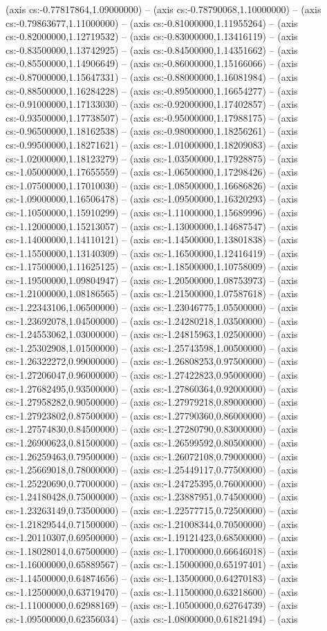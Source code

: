 (axis cs:-0.77817864,1.09000000) -- (axis cs:-0.78790068,1.10000000) -- (axis cs:-0.79863677,1.11000000) -- (axis cs:-0.81000000,1.11955264) -- (axis cs:-0.82000000,1.12719532) -- (axis cs:-0.83000000,1.13416119) -- (axis cs:-0.83500000,1.13742925) -- (axis cs:-0.84500000,1.14351662) -- (axis cs:-0.85500000,1.14906649) -- (axis cs:-0.86000000,1.15166066) -- (axis cs:-0.87000000,1.15647331) -- (axis cs:-0.88000000,1.16081984) -- (axis cs:-0.88500000,1.16284228) -- (axis cs:-0.89500000,1.16654277) -- (axis cs:-0.91000000,1.17133030) -- (axis cs:-0.92000000,1.17402857) -- (axis cs:-0.93500000,1.17738507) -- (axis cs:-0.95000000,1.17988175) -- (axis cs:-0.96500000,1.18162538) -- (axis cs:-0.98000000,1.18256261) -- (axis cs:-0.99500000,1.18271621) -- (axis cs:-1.01000000,1.18209083) -- (axis cs:-1.02000000,1.18123279) -- (axis cs:-1.03500000,1.17928875) -- (axis cs:-1.05000000,1.17655559) -- (axis cs:-1.06500000,1.17298426) -- (axis cs:-1.07500000,1.17010030) -- (axis cs:-1.08500000,1.16686826) -- (axis cs:-1.09000000,1.16506478) -- (axis cs:-1.09500000,1.16320293) -- (axis cs:-1.10500000,1.15910299) -- (axis cs:-1.11000000,1.15689996) -- (axis cs:-1.12000000,1.15213057) -- (axis cs:-1.13000000,1.14687547) -- (axis cs:-1.14000000,1.14110121) -- (axis cs:-1.14500000,1.13801838) -- (axis cs:-1.15500000,1.13140309) -- (axis cs:-1.16500000,1.12416419) -- (axis cs:-1.17500000,1.11625125) -- (axis cs:-1.18500000,1.10758009) -- (axis cs:-1.19500000,1.09804947) -- (axis cs:-1.20500000,1.08753973) -- (axis cs:-1.21000000,1.08186565) -- (axis cs:-1.21500000,1.07587618) -- (axis cs:-1.22343106,1.06500000) -- (axis cs:-1.23046775,1.05500000) -- (axis cs:-1.23692078,1.04500000) -- (axis cs:-1.24280218,1.03500000) -- (axis cs:-1.24553062,1.03000000) -- (axis cs:-1.24815963,1.02500000) -- (axis cs:-1.25302908,1.01500000) -- (axis cs:-1.25743598,1.00500000) -- (axis cs:-1.26322272,0.99000000) -- (axis cs:-1.26808253,0.97500000) -- (axis cs:-1.27206047,0.96000000) -- (axis cs:-1.27422823,0.95000000) -- (axis cs:-1.27682495,0.93500000) -- (axis cs:-1.27860364,0.92000000) -- (axis cs:-1.27958282,0.90500000) -- (axis cs:-1.27979218,0.89000000) -- (axis cs:-1.27923802,0.87500000) -- (axis cs:-1.27790360,0.86000000) -- (axis cs:-1.27574830,0.84500000) -- (axis cs:-1.27280790,0.83000000) -- (axis cs:-1.26900623,0.81500000) -- (axis cs:-1.26599592,0.80500000) -- (axis cs:-1.26259463,0.79500000) -- (axis cs:-1.26072108,0.79000000) -- (axis cs:-1.25669018,0.78000000) -- (axis cs:-1.25449117,0.77500000) -- (axis cs:-1.25220690,0.77000000) -- (axis cs:-1.24725395,0.76000000) -- (axis cs:-1.24180428,0.75000000) -- (axis cs:-1.23887951,0.74500000) -- (axis cs:-1.23263149,0.73500000) -- (axis cs:-1.22577715,0.72500000) -- (axis cs:-1.21829544,0.71500000) -- (axis cs:-1.21008344,0.70500000) -- (axis cs:-1.20110307,0.69500000) -- (axis cs:-1.19121423,0.68500000) -- (axis cs:-1.18028014,0.67500000) -- (axis cs:-1.17000000,0.66646018) -- (axis cs:-1.16000000,0.65889567) -- (axis cs:-1.15000000,0.65197401) -- (axis cs:-1.14500000,0.64874656) -- (axis cs:-1.13500000,0.64270183) -- (axis cs:-1.12500000,0.63719470) -- (axis cs:-1.11500000,0.63218600) -- (axis cs:-1.11000000,0.62988169) -- (axis cs:-1.10500000,0.62764739) -- (axis cs:-1.09500000,0.62356034) -- (axis cs:-1.08000000,0.61821494) -- (axis 